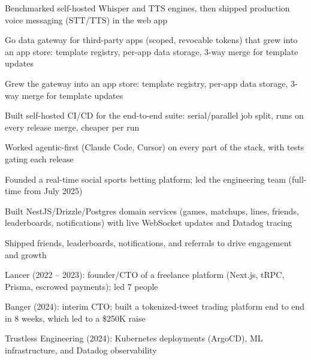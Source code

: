 \documentclass[print]{jack-resume}
\begin{document}
\begin{tightemize}
    \item Benchmarked self-hosted Whisper and TTS engines, then shipped production voice messaging (STT/TTS) in the web app
    \item Go data gateway for third-party apps (scoped, revocable tokens) that grew into an app store: template registry, per-app data storage, 3-way merge for template updates
    \item Grew the gateway into an app store: template registry, per-app data storage, 3-way merge for template updates
    \item Built self-hosted CI/CD for the end-to-end suite: serial/parallel job split, runs on every release merge, cheaper per run
    \item Worked agentic-first (Claude Code, Cursor) on every part of the stack, with tests gating each release
\end{tightemize}
\sectionsep

\begin{tightemize}
    \item Founded a real-time social sports betting platform; led the engineering team (full-time from July 2025)
    \item Built NestJS/Drizzle/Postgres domain services (games, matchups, lines, friends, leaderboards, notifications) with live WebSocket updates and Datadog tracing
    \item Shipped friends, leaderboards, notifications, and referrals to drive engagement and growth
\end{tightemize}
\sectionsep

\begin{tightemize}
    \item Lancer (2022 -- 2023): founder/CTO of a freelance platform (Next.js, tRPC, Prisma, escrowed payments); led 7 people
    \item Banger (2024): interim CTO; built a tokenized-tweet trading platform end to end in 8 weeks, which led to a \$250K raise
    \item Trustless Engineering (2024): Kubernetes deployments (ArgoCD), ML infrastructure, and Datadog observability
\end{tightemize}
\sectionsep
\end{document}
